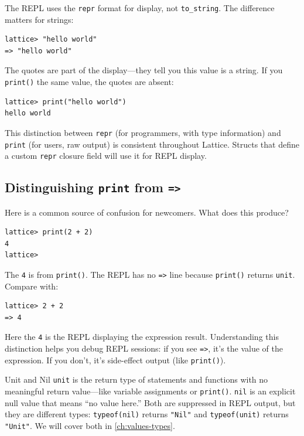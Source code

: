 The REPL uses the \lstinline|repr| format for display, not \lstinline|to_string|.
The difference matters for strings:

\begin{lstlisting}[language=Lattice, numbers=none]
lattice> "hello world"
=> "hello world"
\end{lstlisting}

The quotes are part of the display---they tell you this value is a string.
If you \lstinline|print()| the same value, the quotes are absent:

\begin{lstlisting}[language=Lattice, numbers=none]
lattice> print("hello world")
hello world
\end{lstlisting}

This distinction between \lstinline|repr| (for programmers, with type information) and \lstinline|print| (for users, raw output) is consistent throughout Lattice.
Structs that define a custom \lstinline|repr| closure field will use it for REPL display.

\subsection{Distinguishing \texttt{print} from \texttt{=>}}\label{subsec:print-vs-arrow}

Here is a common source of confusion for newcomers.
What does this produce?

\begin{lstlisting}[language=Lattice, numbers=none]
lattice> print(2 + 2)
4
lattice>
\end{lstlisting}

The \lstinline|4| is from \lstinline|print()|.
The REPL has no \lstinline|=>| line because \lstinline|print()| returns \lstinline|unit|.
Compare with:

\begin{lstlisting}[language=Lattice, numbers=none]
lattice> 2 + 2
=> 4
\end{lstlisting}

Here the \lstinline|4| is the REPL displaying the expression result.
Understanding this distinction helps you debug REPL sessions: if you see \lstinline|=>|, it's the value of the expression.
If you don't, it's side-effect output (like \lstinline|print()|).

\begin{defnbox}{Unit and Nil}
\lstinline|unit| is the return type of statements and functions with no meaningful return value---like variable assignments or \lstinline|print()|.
\lstinline|nil| is an explicit null value that means ``no value here.''
Both are suppressed in REPL output, but they are different types:
\lstinline|typeof(nil)| returns \lstinline|"Nil"| and \lstinline|typeof(unit)| returns \lstinline|"Unit"|.
We will cover both in \cref{ch:values-types}.
\end{defnbox}

